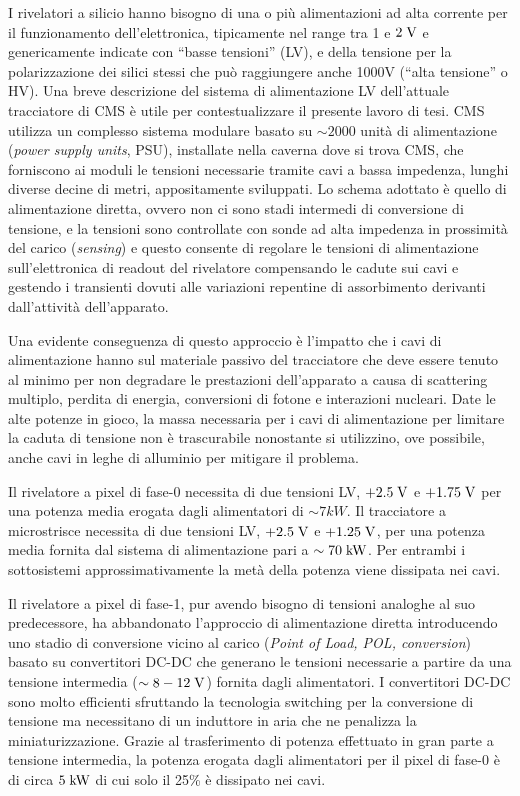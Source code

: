 I rivelatori a silicio hanno bisogno di una o pi\`u alimentazioni ad alta corrente per il funzionamento dell'elettronica, tipicamente nel range tra 1 e $2\rm \; V$ e genericamente indicate con ``basse tensioni'' (LV), e della tensione per la polarizzazione dei silici stessi che pu\`o raggiungere anche 1000V (``alta tensione'' o HV). Una breve descrizione del sistema di alimentazione LV dell'attuale tracciatore di CMS \`e utile per contestualizzare il presente lavoro di tesi. CMS utilizza un complesso sistema modulare basato su $\sim 2000$ unit\`a di alimentazione ({\em power supply units}, PSU), installate nella caverna dove si trova CMS, che forniscono ai moduli le tensioni necessarie tramite cavi a bassa impedenza, lunghi diverse decine di metri,
appositamente sviluppati. Lo schema adottato \`e quello di alimentazione diretta, ovvero non ci sono stadi intermedi di conversione di tensione, e la tensioni sono controllate con sonde ad alta impedenza in prossimit\`a del carico ({\em sensing}) e questo consente di regolare le tensioni di alimentazione sull’elettronica di readout del rivelatore compensando le cadute sui cavi e gestendo i transienti dovuti alle variazioni repentine di assorbimento derivanti dall'attivit\`a dell'apparato.

Una evidente conseguenza di questo approccio \`e l'impatto che i cavi di alimentazione hanno sul materiale passivo del tracciatore che deve essere tenuto al minimo per non degradare le prestazioni dell'apparato a causa di scattering multiplo, perdita di energia, conversioni di fotone e interazioni nucleari.  
Date le alte potenze in gioco, la massa necessaria per i cavi di alimentazione per limitare la caduta di tensione non \`e trascurabile nonostante si utilizzino, ove possibile, anche cavi in leghe di alluminio per mitigare il problema.

Il rivelatore a pixel di fase-0 necessita di due tensioni LV, $+2.5\rm \; V$ e $+1.75\rm \; V$ per una potenza media erogata dagli alimentatori di $\sim 7kW$. Il tracciatore a microstrisce necessita di due tensioni LV, $+2.5\rm \; V$ e $+1.25\rm \; V$, per una potenza media fornita dal sistema di alimentazione pari a $\sim 70\rm \; kW$. Per entrambi i sottosistemi approssimativamente la met\`a della potenza viene dissipata nei cavi.

Il rivelatore a pixel di fase-1, pur avendo bisogno di tensioni analoghe al suo predecessore, ha abbandonato l'approccio di alimentazione diretta introducendo uno stadio di conversione vicino al carico ({\em Point of Load, POL, conversion}) basato su convertitori DC-DC che generano le tensioni necessarie a partire da una tensione intermedia ($\sim 8-12\rm \; V$) fornita dagli alimentatori. I convertitori DC-DC sono molto efficienti sfruttando la tecnologia switching per la conversione di tensione ma necessitano di un induttore in aria che ne penalizza la miniaturizzazione. Grazie al trasferimento di potenza effettuato in gran parte a tensione intermedia, la potenza erogata dagli alimentatori per il pixel di fase-0 \`e di circa $5\rm \; kW$ di cui solo il 25\% \`e dissipato nei cavi.

